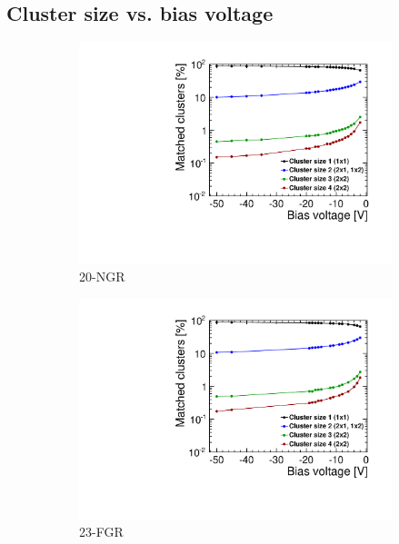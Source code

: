 \subsection{Cluster size vs. bias voltage}
\begin{figure}[htbp] \centering
  \begin{subfigure}[b]{0.33\textwidth}
    \includegraphics[width=\textwidth]{./figures/TestBeam/cluSize_biasScan_W0019_G07.pdf}
    \caption{20-NGR}
  \end{subfigure} \hfill
  \begin{subfigure}[b]{0.33\textwidth}
    \includegraphics[width=\textwidth]{./figures/TestBeam/cluSize_biasScan_W0019_F07.pdf}
    \caption{23-FGR}
  \end{subfigure}\hfill
  \begin{subfigure}[b]{0.33\textwidth}

\end{subfigure}
\end{figure}
